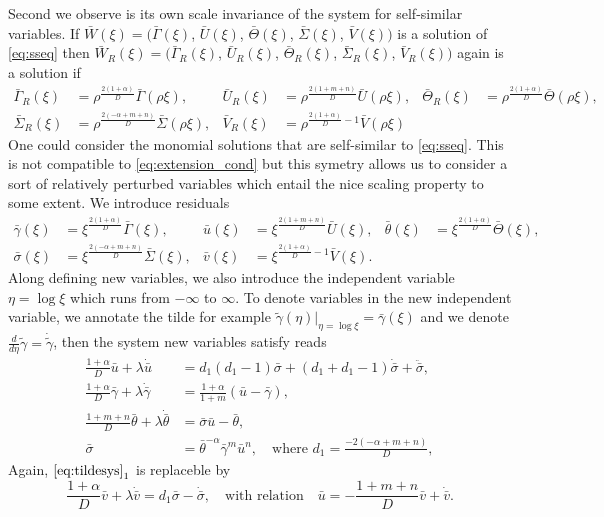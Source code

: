 \documentclass[a4paper,11pt]{article}
\def\blue{\color{blue}}
\def\bG{{\bar{\Gamma}}}
\def\bV{{\bar{V}}}
\def\bTh{{\bar{\Theta}}}
\def\bS{{\bar{\Sigma}}}
\def\bU{{\bar{U}}}
\def\bg{{\bar{\gamma}}}
\def\bv{{\bar{v}}}
\def\bth{{\bar{\theta}}}
\def\bs{{\bar{\sigma}}}
\def\bu{{\bar{u}}}
\def\tg{{\tilde{\gamma}}}
\theoremstyle{remark}
\begin{document}
Second we observe is its own scale invariance of the system for self-similar variables. If $\bar{W}(\xi)=\big(\bG(\xi)$, $\bU(\xi)$, $\bTh(\xi)$, $\bS(\xi)$, $\bV(\xi)\big)$ is a solution of \eqref{eq:sseq} then $\bar{W}_R(\xi)=\big(\bG _R(\xi)$, $\bU_R(\xi)$, $\bTh_R(\xi)$, $\bS_R(\xi)$, $\bV_R(\xi)\big)$ again is a solution if
{\blue
\begin{align*}
\bG _R(\xi)&=\rho^ \frac{2(1+ \alpha)}{D}\bG(\rho\xi), & \bU _R(\xi) &= \rho^ \frac{2(1+ m+n)}{D}\bU(\rho\xi), & 
\bTh _R(\xi)&=\rho^ \frac{2(1+ \alpha)}{D}\bTh(\rho\xi), \\
\bS _R(\xi)&=\rho^ \frac{2(-\alpha+m+n)}{D}\bS(\rho\xi), & \bV _R(\xi) &=\rho^ {\frac{2(1+ \alpha)}{D}-1}\bV(\rho\xi)
\end{align*}
}
One could consider the monomial solutions that are self-similar to \eqref{eq:sseq}. This is not compatible to \eqref{eq:extension_cond} but this symetry allows us to consider a sort of relatively perturbed variables which entail the nice scaling property to some extent. We introduce residuals 
\begin{align*}
\bg(\xi) &= \xi^ \frac{2(1+ \alpha)}{D}\bG(\xi), & \bu(\xi) &= \xi^ \frac{2(1+ m+n)}{D}\bU(\xi), & 
\bth(\xi)&=\xi^ \frac{2(1+ \alpha)}{D}\bTh(\xi), \\
\bs(\xi)&=\xi^ \frac{2(-\alpha+m+n)}{D}\bS(\xi), & \bv(\xi) &=\xi^ {\frac{2(1+ \alpha)}{D}-1}\bV(\xi).
\end{align*}
Along defining new variables, we also introduce the independent variable $\eta = \log\xi$ which runs from $-\infty$ to $\infty$. To denote variables in the new independent variable, we annotate the tilde for example $\tg(\eta)|_{\eta=\log\xi}=\bg(\xi)$ and we denote $\frac{d}{d\eta} \tg = \dot\tg$, then the system new variables satisfy reads 
\begin{equation} \label{eq:tildesys}
\begin{aligned}
\frac{1+ \alpha}{D} \bu + \lambda \dot\bu &= d_1(d_1-1)\bs + (d_1+d_1-1)\dot\bs + \ddot\bs,\\
\frac{1+ \alpha}{D} \bg + \lambda \dot\bg &= \frac{1 + \alpha}{1+m}( \bu - \bg ),\\
\frac{1+ m+n}{D} \bth + \lambda \dot\bth &= \bs\bu-\bth,\\
\bs &=\bth^{- \alpha} \bg ^m \bu ^n, \quad \text{where $d_1=\frac{-2(- \alpha +m+n)}{D}$},
\end{aligned}
\end{equation}
Again, $\eqref{eq:tildesys}_1$ is replaceble by
$$\frac{1+ \alpha}{D} \bv + \lambda \dot\bv = d_1 \bs -\dot\bs, \quad \text{with relation} \quad \bu = -\frac{1+m+n}{D}\bv + \dot\bv.$$
\end{document}
